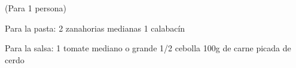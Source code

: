 (Para 1 persona)

Para la pasta:
2 zanahorias medianas
1 calabacín

Para la salsa:
1 tomate mediano o grande
1/2 cebolla
100g de carne picada de cerdo
